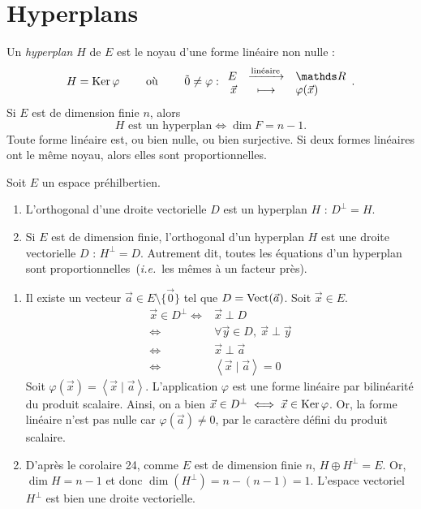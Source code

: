 \section{Hyperplans}

\begin{rap}
	Un \textit{hyperplan} $H$\/ de $E$\/ est le noyau d'une forme linéaire non nulle : \[
		H = \Ker \varphi \quad\quad \text{ où }\quad\quad \tilde0 \neq \varphi : \begin{array}{rcl}
			E &\xrightarrow{\text{linéaire}}& \R \\
			\vec{x} &\longmapsto& \varphi(\vec{x})
		\end{array}
	.\]
	Si $E$\/ est de dimension finie $n$, alors \[
		H \text{ est un hyperplan} \iff \dim F = n - 1
	.\]
	Toute forme linéaire est, ou bien nulle, ou bien surjective.
	Si deux formes linéaires ont le même noyau, alors elles sont proportionnelles.
\end{rap}

\begin{prop}
	Soit $E$\/ un espace préhilbertien.
	\begin{enumerate}
		\item L'orthogonal d'une droite vectorielle $D$\/ est un hyperplan $H$\/ : $D^\perp = H$.
		\item Si $E$\/ est de dimension finie, l'orthogonal d'un hyperplan $H$\/ est une droite vectorielle $D$\/ : $H^\perp = D$.
			Autrement dit, toutes les équations d'un hyperplan sont proportionnelles~(\textit{i.e.}\ les mêmes à un facteur près).
	\end{enumerate}
\end{prop}

\begin{prv}
	\begin{enumerate}
		\item Il existe un vecteur $\vec{a} \in E \setminus \{\vec{0}\}$\/ tel que $D = \operatorname{Vect}(\vec{a})$. Soit $\vec{x} \in E$.
			\begin{align*}
				\vec{x} \in D^\perp \iff& \vec{x} \perp D\\
				\iff& \forall \vec{y} \in D,\:\vec{x} \perp \vec{y}\\
				\iff& \vec{x} \perp \vec{a}\\
				\iff& \left<\vec{x}  \mid \vec{a} \right> = 0
			\end{align*}
			Soit $\varphi(\vec{x}) = \left<\vec{x}  \mid \vec{a} \right>$. L'application $\varphi$\/ est une forme linéaire par bilinéarité du produit scalaire. Ainsi, on a bien $\vec{x} \in D^\perp \iff \vec{x} \in \operatorname{Ker}\varphi$. Or, la forme linéaire n'est pas nulle car $\varphi(\vec{a}) \neq 0$, par le caractère défini du produit scalaire.
		\item D'après le corolaire 24, comme $E$\/ est de dimension finie $n$, $H \oplus H^\perp = E$. Or, $\dim H = n - 1$\/ et donc $\dim (H^\perp) = n - (n-1) = 1$. L'espace vectoriel $H^\perp$\/ est bien une droite vectorielle.
	\end{enumerate}
\end{prv}

